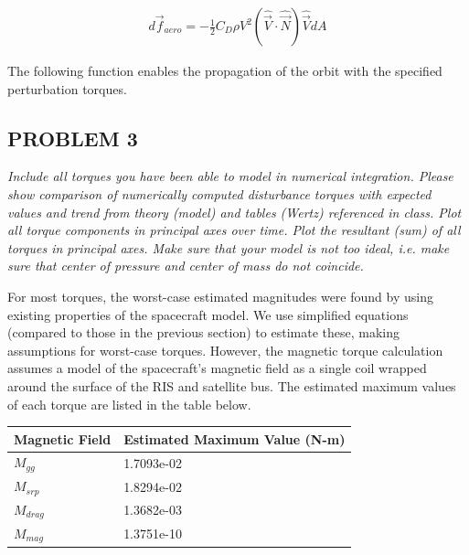 \begin{align*}
    d \Vec{f}_{aero} = - \frac{1}{2} C_D \rho V^2 (\hat{\Vec{V}} \cdot \hat{\Vec{N}}) \hat{\Vec{V}} dA
\end{align*}


The following function enables the propagation of the orbit with the specified perturbation torques.






\subsection{PROBLEM 3}
\textit{Include all torques you have been able to model in numerical integration. Please show comparison of numerically computed disturbance torques with expected values and trend from theory (model) and tables (Wertz) referenced in class. Plot all torque components in principal axes over time. Plot the resultant (sum) of all torques in principal axes. Make sure that your model is not too ideal, i.e. make sure that center of pressure and center of mass do not coincide.}

For most torques, the worst-case estimated magnitudes were found by using existing properties of the spacecraft model. We use simplified equations (compared to those in the previous section) to estimate these, making assumptions for worst-case torques. However, the magnetic torque calculation assumes a model of the spacecraft's magnetic field as a single coil wrapped around the surface of the RIS and satellite bus. The estimated maximum values of each torque are listed in the table below.

\begin{table}[H]
\centering
\begin{tabular}{l|l} 

Magnetic Field & Estimated Maximum Value (N-m)  \\ 
\hline
$M_{gg}$          & 1.7093e-02                  \\ 
\hline
$M_{srp}$         & 1.8294e-02                  \\ 
\hline
$M_{drag}$        & 1.3682e-03                  \\ 
\hline
$M_{mag}$         & 1.3751e-10                  \\
\end{tabular}
\end{table}

